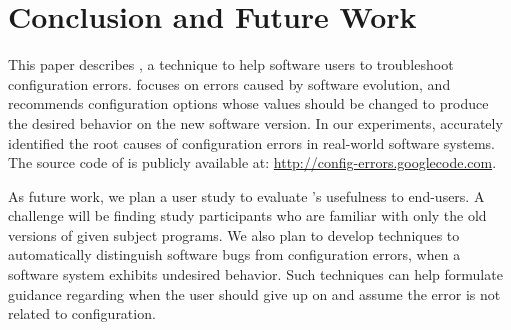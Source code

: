 \section{Conclusion and Future Work}
\label{sec:conclusion}


This paper describes \ourtool, a technique to help software
users to troubleshoot configuration errors. \ourtool
focuses on errors caused by software evolution, and
recommends configuration options whose values should be changed to
produce the desired behavior on the new software version.
In our experiments, \ourtool
accurately identified the root causes of
\errornum configuration errors in \subjnum real-world software systems.
The source code of \ourtool is publicly available
at: \url{http://config-errors.googlecode.com}.

As future work, we plan a user study to evaluate
\ourtool's usefulness to end-users. A challenge
will be finding study participants who are familiar
with only the old versions of given subject programs.
We also plan to develop techniques to
automatically distinguish software bugs from 
configuration errors, when a software system exhibits
undesired behavior.
Such techniques can help formulate guidance
regarding when the user should give up on \ourtool
and assume the error is not related to configuration.

